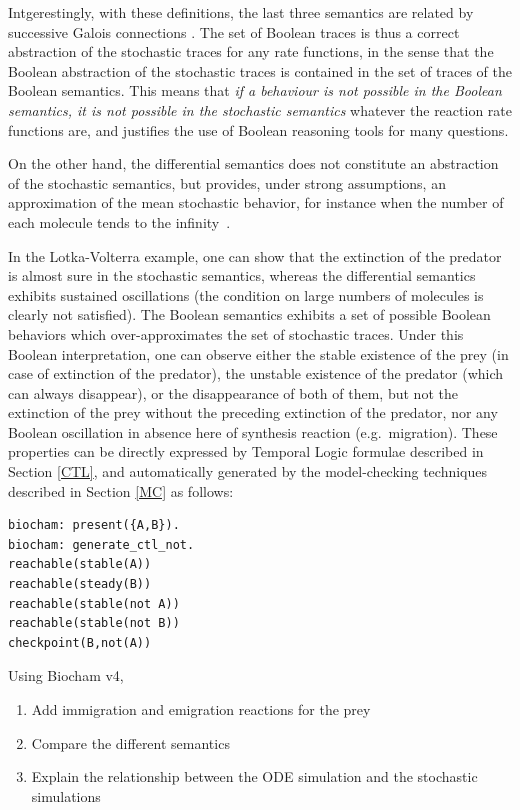 \documentclass[graybox]{svmult}
\begin{document}
Intgerestingly, with these definitions, the last three semantics are
related by successive Galois connections \cite{FS08tcs}.
The set of Boolean traces is thus a correct abstraction of the stochastic traces for any rate functions,
in the sense that the Boolean abstraction of the stochastic traces is contained in the set of traces of the Boolean semantics.
This means that \emph{if a behaviour is not possible in the Boolean semantics,
  it is not possible in the stochastic semantics} whatever the reaction rate functions are,
and justifies the use of Boolean reasoning tools for many questions.

On the other hand, the differential semantics does not constitute an abstraction of the stochastic semantics,
but provides, under strong assumptions,
 an approximation of the mean stochastic behavior, for instance when the number of each molecule tends to the infinity~\cite{Gillespie77jpc}.


\begin{example}\label{LVbool}
  In the Lotka-Volterra example, one can show that the extinction of the predator is almost sure in the stochastic semantics,
  whereas the differential semantics exhibits sustained oscillations
  (the condition on large numbers of molecules is clearly not satisfied).
  The Boolean semantics exhibits a set of possible Boolean behaviors
  which over-approximates the set of stochastic traces.
   Under this Boolean interpretation, one can observe either
   the stable existence of the prey (in case of extinction of the predator),
   the unstable existence of the predator (which can always disappear),
   or the disappearance of both of them,
but not the extinction of the prey without the preceding extinction of the predator,
nor any Boolean oscillation in absence here of synthesis reaction (e.g.~migration).
These properties can be directly expressed by Temporal Logic formulae described in Section \ref{CTL},
and automatically generated by the model-checking techniques described in Section \ref{MC} as follows:
     \begin{lstlisting}
biocham: present({A,B}).
biocham: generate_ctl_not.
reachable(stable(A))
reachable(steady(B))
reachable(stable(not A))
reachable(stable(not B))
checkpoint(B,not(A))
   \end{lstlisting}
\end{example}

\begin{exercise}\label{LVrExo} Using Biocham v4,
  \begin{enumerate}
  \item Add immigration and emigration reactions for the prey
  \item Compare the different semantics
  \item Explain the relationship between the ODE simulation and the stochastic simulations
    \end{enumerate}
\end{exercise}
\end{document}
